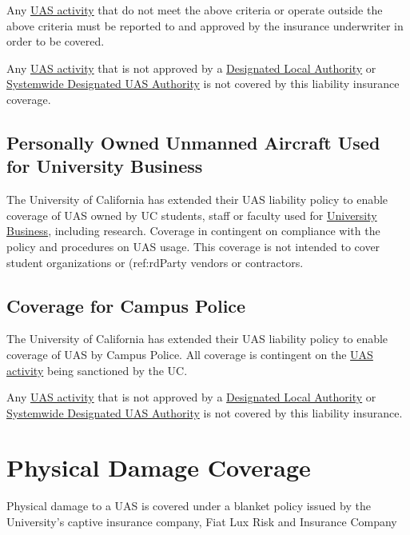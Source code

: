 \documentclass[
]{book}
\begin{document}
Any \protect\hyperlink{UASactivity}{UAS activity} that do not meet the above criteria or operate outside the above criteria must be reported to and approved by the insurance underwriter in order to be covered.

Any \protect\hyperlink{UASactivity}{UAS activity} that is not approved by a \protect\hyperlink{DLA}{Designated Local Authority} or \protect\hyperlink{SDA}{Systemwide Designated UAS Authority} is not covered by this liability insurance coverage.

\hypertarget{ss-personally-owned-UAS-coverage}{%
\subsection{Personally Owned Unmanned Aircraft Used for University Business}\label{ss-personally-owned-UAS-coverage}}

The University of California has extended their UAS liability policy to enable coverage of UAS owned by UC students, staff or faculty used for \protect\hyperlink{UB}{University Business}, including research. Coverage in contingent on compliance with the policy and procedures on UAS usage. This coverage is not intended to cover student organizations or (ref:rdParty vendors or contractors.

\hypertarget{ss-campus-police-coverage}{%
\subsection{Coverage for Campus Police}\label{ss-campus-police-coverage}}

The University of California has extended their UAS liability policy to enable coverage of UAS by Campus Police. All coverage is contingent on the \protect\hyperlink{UASactivity}{UAS activity} being sanctioned by the UC.

Any \protect\hyperlink{UASactivity}{UAS activity} that is not approved by a \protect\hyperlink{DLA}{Designated Local Authority} or \protect\hyperlink{SDA}{Systemwide Designated UAS Authority} is not covered by this liability insurance.

\hypertarget{s-UC-physical-damage}{%
\section{Physical Damage Coverage}\label{s-UC-physical-damage}}

Physical damage to a UAS is covered under a blanket policy issued by the University's captive insurance company, Fiat Lux Risk and Insurance Company
\end{document}
